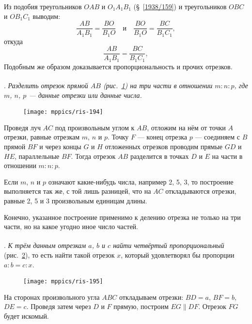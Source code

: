 \documentclass[twoside]{book}
\begin{document}
Из подобия треугольников $OAB$ и $O_1A_1B_1$ (§~\ref{1938/159}) и треугольников $OBC$ и $OB_1C_1$ выводим:
\[\frac{AB}{A_1B_1}=\frac{BO}{B_1O}
\quad\text{и}\quad
\frac{BO}{B_1O}=\frac{BC}{B_1C_1},
\]
откуда
\[\frac{AB}{A_1B_1}=\frac{BC}{B_1C_1},
\]
Подобным же образом доказывается пропорциональность и прочих отрезков.

\paragraph{}\label{1938/184}
.
\emph{Разделить отрезок прямой $AB$ \emph{(рис.~\ref{1938/ris-194})} на три части в отношении $m:n:p$, где $m$, $n$, $p$ — данные отрезки или данные числа.}

\begin{figure}[h!]
\centering
\texttt{[image: mppics/ris-194]}
\caption{}\label{1938/ris-194}
\end{figure}

Проведя луч $AC$ под произвольным углом к $AB$, отложим на нём от точки $A$ отрезки, равные отрезкам $m$, $n$ и $p$.
Точку $F$ — конец отрезка $p$ — соединяем с $B$ прямой $BF$ и через концы $G$ и $H$ отложенных отрезков проводим прямые $GD$ и $HE$, параллельные $BF$.
Тогда отрезок $AB$ разделится в точках $D$ и $E$ на части в отношении $m:n:p$.

Если $m$, $n$ и $p$ означают какие-нибудь числа, например 2, 5, 3, то построение выполняется так же, с той лишь разницей, что на $AC$ откладываются отрезки, равные 2, 5 и 3 произвольным единицам длины.

Конечно, указанное построение применимо к делению отрезка не только на три части, но на какое угодно иное число частей.

\paragraph{}\label{1938/185}
.
\emph{К трём данным отрезкам $a$, $b$ и $c$ найти четвёртый пропорциональный} (рис.~\ref{1938/ris-195}), то есть
найти такой отрезок $x$, который удовлетворял бы пропорции $a:b=c:x$.

\begin{figure}[h!]
\centering
\texttt{[image: mppics/ris-195]}
\caption{}\label{1938/ris-195}
\end{figure}

На сторонах произвольного угла $ABC$ откладываем отрезки:
$BD=a$, $BF=b$, $DE=c$.
Проведя затем через $D$ и $F$ прямую, построим $EG\parallel DF$.
Отрезок $FG$ будет искомый.
\end{document}
